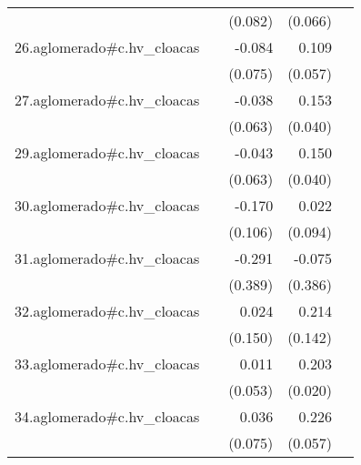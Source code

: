 {\begin{longtable}{l*{4}{D{.}{.}{-1}}}
            &                     &     (0.082)         &     (0.066)         &                     \\
\addlinespace
26.aglomerado#c.hv\_cloacas&                     &      -0.084         &       0.109         &                     \\
            &                     &     (0.075)         &     (0.057)         &                     \\
\addlinespace
27.aglomerado#c.hv\_cloacas&                     &      -0.038         &       0.153\sym{***}&                     \\
            &                     &     (0.063)         &     (0.040)         &                     \\
\addlinespace
29.aglomerado#c.hv\_cloacas&                     &      -0.043         &       0.150\sym{***}&                     \\
            &                     &     (0.063)         &     (0.040)         &                     \\
\addlinespace
30.aglomerado#c.hv\_cloacas&                     &      -0.170         &       0.022         &                     \\
            &                     &     (0.106)         &     (0.094)         &                     \\
\addlinespace
31.aglomerado#c.hv\_cloacas&                     &      -0.291         &      -0.075         &                     \\
            &                     &     (0.389)         &     (0.386)         &                     \\
\addlinespace
32.aglomerado#c.hv\_cloacas&                     &       0.024         &       0.214         &                     \\
            &                     &     (0.150)         &     (0.142)         &                     \\
\addlinespace
33.aglomerado#c.hv\_cloacas&                     &       0.011         &       0.203\sym{***}&                     \\
            &                     &     (0.053)         &     (0.020)         &                     \\
\addlinespace
34.aglomerado#c.hv\_cloacas&                     &       0.036         &       0.226\sym{***}&                     \\
            &                     &     (0.075)         &     (0.057)         &                     \\

\end{longtable}}
